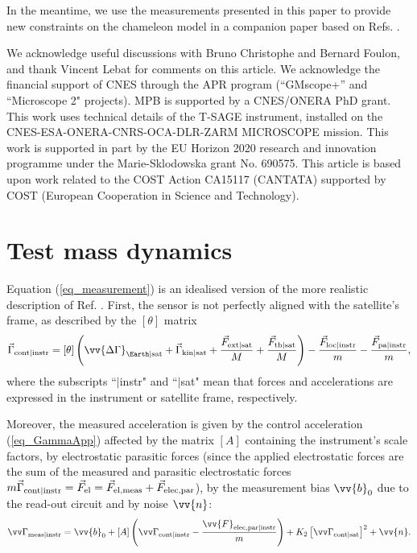 \documentclass[12pt]{iopart}
\begin{document}
In the meantime, we use the measurements presented in this paper to provide new constraints on the chameleon model in a companion paper \cite{pernotborras_inprep} based on Refs. \cite{pernotborras19, pernotborras20}.


\ack
We acknowledge useful discussions with Bruno Christophe and Bernard Foulon, and thank Vincent Lebat for comments on this article.
We acknowledge the financial support of CNES through the APR program (``GMscope+'' and ``Microscope 2" projects). MPB is supported by a CNES/ONERA PhD grant. This work uses technical details of the T-SAGE instrument, installed on the CNES-ESA-ONERA-CNRS-OCA-DLR-ZARM MICROSCOPE mission. This work is supported in part by the EU Horizon 2020 research and innovation programme under the Marie-Sklodowska grant No. 690575. This article is based upon work related to the COST Action CA15117 (CANTATA) supported by COST (European Cooperation in Science and Technology).



\appendix
\section{Test mass dynamics} \label{app_dynamics}

Equation (\ref{eq_measurement}) is an idealised version of the more realistic description of Ref. \cite{touboul20}. First, the sensor is not perfectly aligned with the satellite's frame, as described by the $[\theta]$ matrix
\begin{equation} \label{eq_GammaApp}
\vec\Gamma_{\rm cont | instr} = [\theta] \left( \vv{\Delta\Gamma}_{\Earth | \rm sat} + \vec\Gamma_{\rm kin | sat} + \frac{\vec{F}_{\rm ext | sat}}{M}+ \frac{\vec{F}_{\rm th | sat}}{M} \right) - \frac{\vec{F}_{\rm loc | instr}}{m} - \frac{\vec{F}_{\rm pa | instr}}{m},
\end{equation}
where the subscripts ``$|$instr" and ``$|$sat" mean that forces and accelerations are expressed in the instrument or satellite frame, respectively.

Moreover, the measured acceleration is given by the control acceleration (\ref{eq_GammaApp}) affected by the matrix $[A]$ containing the instrument's scale factors, by electrostatic parasitic forces (since the applied electrostatic forces are the sum of the measured and parasitic electrostatic forces $m \vec\Gamma_{\rm cont | instr} = \vec{F}_{\rm el} = \vec{F}_{\rm el, meas} + \vec{F}_{\rm elec, par}$), by the measurement bias $\vv{b}_0$ due to the read-out circuit and by noise $\vv{n}$:
\begin{equation}
\vv\Gamma_{\rm meas | instr} = \vv{b}_0 + [A] \left( \vv\Gamma_{\rm cont | instr} - \frac{\vv{F}_{\rm elec, par | instr}}{m}\right) + K_2 \left[\vv\Gamma_{\rm cont | sat} \right]^2 + \vv{n}.
\end{equation}
\end{document}
